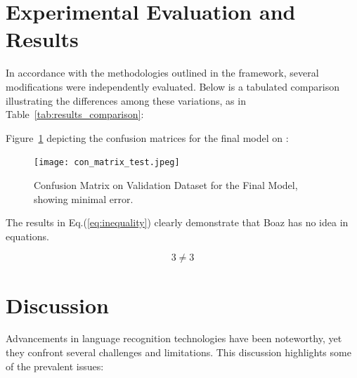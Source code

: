 \documentclass[3p,times]{elsarticle}
\begin{document}
    \section{Experimental Evaluation and Results} \label{sec:exp_eval}



    In accordance with the methodologies outlined in the framework, several modifications were independently evaluated. Below is a tabulated comparison illustrating the differences among these variations, as in Table~\ref{tab:results_comparison}:

    \begin{table}[ht]
        \centering
        \caption{Comparative Analysis of Model Improvements on Validation Dataset.}
        \label{tab:results_comparison}
    \end{table}


    Figure~\ref{fig:conf_matrix_test} depicting the confusion matrices for the final model on :

    \begin{figure}[htp]
        \centering
        \texttt{[image: con\_matrix\_test.jpeg]}
        \caption{Confusion Matrix on Validation Dataset for the Final Model, showing minimal error.}
        \label{fig:conf_matrix_test}
    \end{figure}



    The results in Eq.(\ref{eq:inequality}) clearly demonstrate that Boaz has no idea in equations.

    \begin{equation} \label{eq:inequality}
    3 \neq 3
    \end{equation}


    \section{Discussion} \label{sec:discussion}

    Advancements in language recognition technologies have been noteworthy, yet they confront several challenges and limitations. This discussion highlights some of the prevalent issues:
\end{document}

